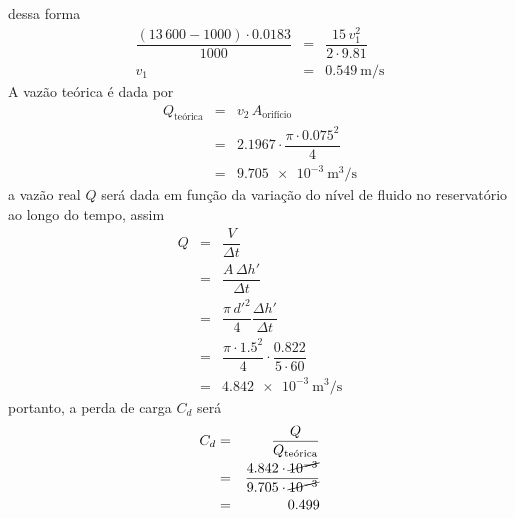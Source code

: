 \documentclass[a4paper, 12pt, brazilian]{article}
\numberwithin{equation}{section}
\begin{document}
	dessa forma
	\begin{eqnarray}
		\dfrac{(13\,600-1000)\cdot 0.0183}{1000}&=&\dfrac{15\,v_{1}^{2}}{2\cdot 9.81}\\
		v_{1}&=&\SI{0.549}{\meter/\second}
	\end{eqnarray}
	A vazão teórica é dada por
	\begin{eqnarray}
		Q_{\textrm{teórica}}&=&v_{2}\,A_{\textrm{orifício}}\\
		&=&2.1967\cdot\dfrac{\pi\cdot 0.075^{2}}{4}\\
		&=&\SI{9.705e-3}{\meter^{3}/\second}
	\end{eqnarray}
	a vazão real $Q$ será dada em função da variação do nível de fluido no reservatório ao longo do tempo, assim
	\begin{eqnarray}
		Q&=&\dfrac{V}{\Delta t}\\
		 &=&\dfrac{A\,\Delta h'}{\Delta t}\\
		 &=&\dfrac{\pi\,d'^{2}}{4}\dfrac{\Delta h'}{\Delta t}\\
		 &=&\dfrac{\pi\cdot 1.5^{2}}{4}\cdot\dfrac{0.822}{5\cdot 60}\\
		 &=&\SI{4.842e-3}{\meter^{3}/\second}
	\end{eqnarray}
	portanto, a perda de carga $C_{d}$ será
	\begin{eqnarray}
		C_{d}&=&\dfrac{Q}{Q_{\textrm{teórica}}}\\
		&=&\dfrac{4.842\cdot \cancel{10^{-3}}}{9.705\cdot \cancel{10^{-3}}}\\
		&=&0.499
	\end{eqnarray}
\end{document}
